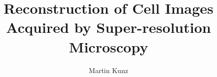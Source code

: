 
\title[Super-Resolution Imaging]{Reconstruction of Cell Images Acquired by Super-resolution Microscopy}
\author[MK]{Martin Kunz}


